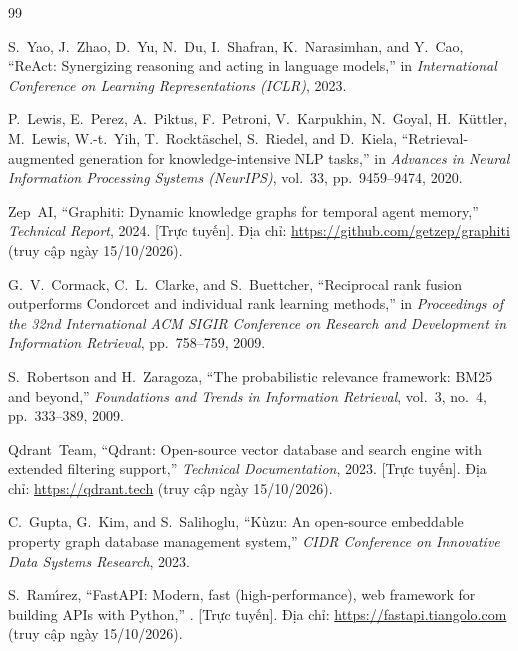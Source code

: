 \documentclass[a4paper,11pt]{article}
\begin{document}
\clearpage
\begin{thebibliography}{99}

S.~Yao, J.~Zhao, D.~Yu, N.~Du, I.~Shafran, K.~Narasimhan, and Y.~Cao,
\newblock ``ReAct: Synergizing reasoning and acting in language models,''
\newblock in \emph{International Conference on Learning Representations (ICLR)}, 2023.

P.~Lewis, E.~Perez, A.~Piktus, F.~Petroni, V.~Karpukhin, N.~Goyal, H.~K\"{u}ttler, M.~Lewis, W.-t.~Yih, T.~Rockt\"{a}schel, S.~Riedel, and D.~Kiela,
\newblock ``Retrieval-augmented generation for knowledge-intensive NLP tasks,''
\newblock in \emph{Advances in Neural Information Processing Systems (NeurIPS)}, vol.~33, pp.~9459--9474, 2020.

Zep~AI,
\newblock ``Graphiti: Dynamic knowledge graphs for temporal agent memory,''
\newblock \emph{Technical Report}, 2024. [Trực tuyến]. Địa chỉ: \url{https://github.com/getzep/graphiti} (truy cập ngày 15/10/2026).

G.~V.~Cormack, C.~L.~Clarke, and S.~Buettcher,
\newblock ``Reciprocal rank fusion outperforms Condorcet and individual rank learning methods,''
\newblock in \emph{Proceedings of the 32nd International ACM SIGIR Conference on Research and Development in Information Retrieval}, pp.~758--759, 2009.

S.~Robertson and H.~Zaragoza,
\newblock ``The probabilistic relevance framework: BM25 and beyond,''
\newblock \emph{Foundations and Trends in Information Retrieval}, vol.~3, no.~4, pp.~333--389, 2009.

Qdrant~Team,
\newblock ``Qdrant: Open-source vector database and search engine with extended filtering support,''
\newblock \emph{Technical Documentation}, 2023. [Trực tuyến]. Địa chỉ: \url{https://qdrant.tech} (truy cập ngày 15/10/2026).

C.~Gupta, G.~Kim, and S.~Salihoglu,
\newblock ``K\`{u}zu: An open-source embeddable property graph database management system,''
\newblock \emph{CIDR Conference on Innovative Data Systems Research}, 2023.

S.~Ram\'{\i}rez,
\newblock ``FastAPI: Modern, fast (high-performance), web framework for building APIs with Python,''
. [Trực tuyến]. Địa chỉ: \url{https://fastapi.tiangolo.com} (truy cập ngày 15/10/2026).


\end{thebibliography}
\end{document}
